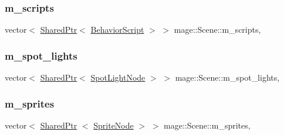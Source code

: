 \hypertarget{classmage_1_1_scene_a84548bf6978f8955ce5892cb23536a4e}{}\label{classmage_1_1_scene_a84548bf6978f8955ce5892cb23536a4e} 
\subsubsection{\texorpdfstring{m\+\_\+scripts}{m\_scripts}}
{\footnotesize\ttfamily vector$<$ \hyperlink{namespacemage_a1e01ae66713838a7a67d30e44c67703e}{Shared\+Ptr}$<$ \hyperlink{classmage_1_1_behavior_script}{Behavior\+Script} $>$ $>$ mage\+::\+Scene\+::m\+\_\+scripts\hspace{0.3cm}{\ttfamily [mutable]}, {\ttfamily [private]}}

\hypertarget{classmage_1_1_scene_a4e1954bc0b812d6a71123ca3ac9eeb75}{}\label{classmage_1_1_scene_a4e1954bc0b812d6a71123ca3ac9eeb75} 
\subsubsection{\texorpdfstring{m\+\_\+spot\+\_\+lights}{m\_spot\_lights}}
{\footnotesize\ttfamily vector$<$ \hyperlink{namespacemage_a1e01ae66713838a7a67d30e44c67703e}{Shared\+Ptr}$<$ \hyperlink{namespacemage_aeed5dee4ff6c591eabb0e9114256df4a}{Spot\+Light\+Node} $>$ $>$ mage\+::\+Scene\+::m\+\_\+spot\+\_\+lights\hspace{0.3cm}{\ttfamily [mutable]}, {\ttfamily [private]}}

\hypertarget{classmage_1_1_scene_a2d68edf08b57dde36ec7cf1f5a91d281}{}\label{classmage_1_1_scene_a2d68edf08b57dde36ec7cf1f5a91d281} 
\subsubsection{\texorpdfstring{m\+\_\+sprites}{m\_sprites}}
{\footnotesize\ttfamily vector$<$ \hyperlink{namespacemage_a1e01ae66713838a7a67d30e44c67703e}{Shared\+Ptr} $<$ \hyperlink{classmage_1_1_sprite_node}{Sprite\+Node} $>$ $>$ mage\+::\+Scene\+::m\+\_\+sprites\hspace{0.3cm}{\ttfamily [mutable]}, {\ttfamily [private]}}

